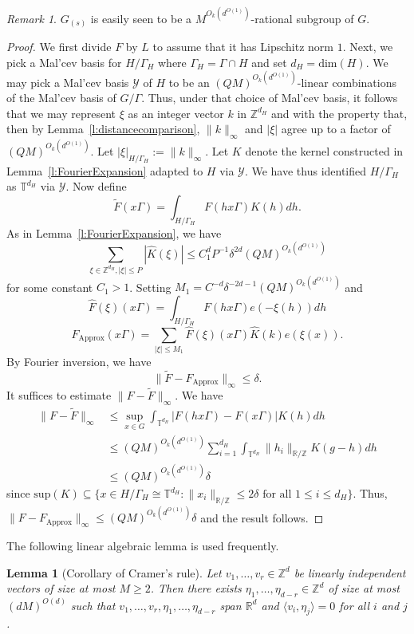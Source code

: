\documentclass[11pt, a4paper]{amsart}
\theoremstyle{plain}
\theoremstyle{plain}
\newtheorem{lemma}{Lemma}
\theoremstyle{definition}
\theoremstyle{remark}
\newtheorem*{remark}{Remark}
\numberwithin{equation}{section}
\numberwithin{lemma}{section}
\numberwithin{proposition}{section}
\numberwithin{corollary}{section}
\numberwithin{definition}{section}
\numberwithin{claim}{section}
\begin{document}
\begin{remark}
$G_{(s)}$ is easily seen to be a $M^{O_k(d^{O(1)})}$-rational subgroup of $G$.
\end{remark}
\begin{proof}
We first divide $F$ by $L$ to assume that it has Lipschitz norm $1$. Next, we pick a Mal'cev basis for $H/\Gamma_H$ where $\Gamma_{H} = \Gamma \cap H$ and set $d_H = \mathrm{dim}(H)$. We may pick a Mal'cev basis $\mathcal{Y}$ of $H$ to be an $(QM)^{O_k(d^{O(1)})}$-linear combinations of the Mal'cev basis of $G/\Gamma$. Thus, under that choice of Mal'cev basis, it follows that we may represent $\xi$ as an integer vector $k$ in $\mathbb{Z}^{d_H}$ and with the property that, then by Lemma~\ref{l:distancecomparison}, $\|k\|_{\infty}$ and $|\xi|$ agree up to a factor of $(QM)^{O_k(d^{O(1)})}$. Let $|\xi|_{H/\Gamma_{H}} := \|k\|_\infty$. Let $K$ denote the kernel constructed in Lemma~\ref{l:FourierExpansion} adapted to $H$ via $\mathcal{Y}$. We have thus identified $H/\Gamma_H$ as $\mathbb{T}^{d_H}$ via $\mathcal{Y}$. Now define
$$\tilde{F}(x\Gamma) = \int_{H/\Gamma_H} F(h x\Gamma) K(h) dh.$$
As in Lemma~\ref{l:FourierExpansion}, we have
$$\sum_{\xi \in \mathbb{Z}^{d_H}, |\xi| \le P} |\hat{K}(\xi)| \le C_1^dP^{-1}\delta^{2d}(QM)^{O_k(d^{O(1)})}$$
for some constant $C_1 > 1$. Setting $M_1 = C^{-d} \delta^{-2d - 1}(QM)^{O_k(d^{O(1)})}$ and
$$\hat{F}(\xi)(x\Gamma) = \int_{H/\Gamma_H} F(h x\Gamma) e(-\xi(h)) dh$$
$$F_{\mathrm{Approx}}(x\Gamma) = \sum_{|\xi| \le M_1} \hat{F}(\xi)(x\Gamma) \hat{K}(k) e(\xi(x)).$$
By Fourier inversion, we have
$$\|\tilde{F} - F_{\mathrm{Approx}}\|_\infty \le \delta.$$
It suffices to estimate $\|F - \tilde{F}\|_\infty$. We have
\begin{align*}
\|F - \tilde{F}\|_\infty &\le \sup_{x \in G} \int_{\mathbb{T}^{d_H}} |F(hx\Gamma) - F(x\Gamma)|K(h) dh \\
&\le (QM)^{O_k(d^{O(1)})}\sum_{i = 1}^{d_H} \int_{\mathbb{T}^{d_H}} \|h_i\|_{\mathbb{R}/\mathbb{Z}}K(g - h) dh \\
&\le (QM)^{O_k(d^{O(1)})}\delta
\end{align*}
since $\mathrm{sup}(K) \subseteq \{x \in H/\Gamma_H \cong \mathbb{T}^{d_H} : \|x_i\|_{\mathbb{R}/\mathbb{Z}} \le 2\delta \text{ for all } 1 \le i \le d_H\}$. Thus, $\|F - F_{\mathrm{Approx}}\|_\infty \le (QM)^{O_k(d^{O(1)})}\delta$ and the result follows.
\end{proof}
The following linear algebraic lemma is used frequently.
\begin{lemma}[Corollary of Cramer's rule]\label{l:Cramer}
    Let $v_1, \dots, v_r\in \mathbb{Z}^d$ be linearly independent vectors of size at most $M \ge 2$. Then there exists $\eta_1, \dots, \eta_{d - r} \in \mathbb{Z}^d$ of size at most $(dM)^{O(d)}$ such that $v_1, \dots, v_r, \eta_1, \dots, \eta_{d - r}$ span $\mathbb{R}^d$ and $\langle v_i, \eta_j \rangle = 0$ for all $i$ and $j$.
\end{lemma}
\end{document}
